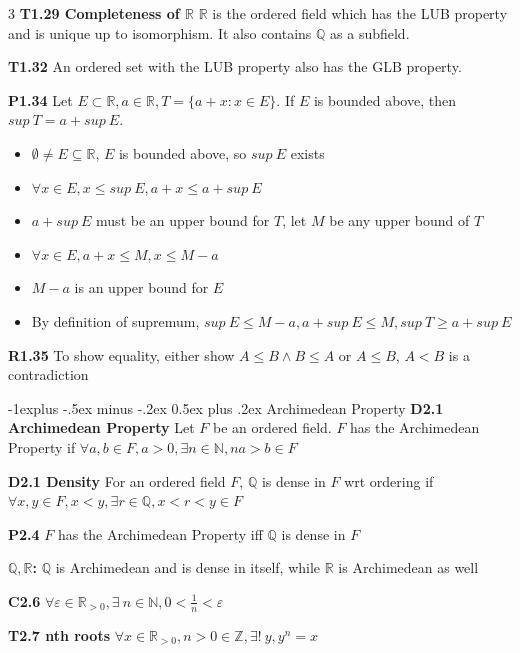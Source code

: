 \documentclass[10pt, landscape]{article}
\makeatletter
\renewcommand{\section}{\@startsection{section}{1}{0mm}%
                                {-1ex plus -.5ex minus -.2ex}%
                                {0.5ex plus .2ex}%
                                {\normalfont\large\bfseries}}
\renewcommand{\section}{\@startsection{section}{2}{0mm}%
                                {-1explus -.5ex minus -.2ex}%
                                {0.5ex plus .2ex}%
                                {\normalfont\normalsize\bfseries}}
\makeatother
\begin{document}
\begin{multicols*}{3}
\textbf{T1.29 Completeness of $\mathbb{R}$} $\mathbb{R}$ is the ordered field which has the LUB property and is unique up to isomorphism. It also contains $\mathbb{Q}$ as a subfield.

\textbf{T1.32} An ordered set with the LUB property also has the GLB property.

\textbf{P1.34} Let $E \subset \mathbb{R}, a \in \mathbb{R}, T=\{a+x:x\in E\}$. If $E$ is bounded above, then $sup\ T=a+sup\ E$.
\begin{itemize}
    \item $\emptyset \neq E \subseteq \mathbb{R}$, $E$ is bounded above, so $sup\ E$ exists
    \item $\forall x \in E, x \leq sup\ E, a+x \leq a + sup\ E$
    \item $a+sup\ E$ must be an upper bound for $T$, let $M$ be any upper bound of $T$
    \item $\forall x \in E, a+x \leq M, x \leq M-a$
    \item $M-a$ is an upper bound for $E$
    \item By definition of supremum, $sup\ E \leq M-a, a+sup\ E \leq M, sup\ T \geq a + sup\ E$
\end{itemize}

\textbf{R1.35} To show equality, either show $A \leq B \land B \leq A$ or $A \leq B$, $A<B$ is a contradiction

\section{Archimedean Property}
\textbf{D2.1 Archimedean Property} Let $F$ be an ordered field. $F$ has the Archimedean Property if $\forall a,b \in F, a > 0, \exists n \in \mathbb{N}, na > b \in F$

\textbf{D2.1 Density} For an ordered field $F$, $\mathbb{Q}$ is dense in $F$ wrt ordering if $\forall x, y \in F, x<y, \exists r \in \mathbb{Q}, x < r < y \in F$

\textbf{P2.4} $F$ has the Archimedean Property iff $\mathbb{Q}$ is dense in $F$

\textbf{$\mathbb{Q}, \mathbb{R}$:} $\mathbb{Q}$ is Archimedean and is dense in itself, while $\mathbb{R}$ is Archimedean as well

\textbf{C2.6} $\forall \varepsilon \in \mathbb{R}_{>0}, \exists\ n \in \mathbb{N}, 0 < \frac{1}{n} < \varepsilon$

\textbf{T2.7 nth roots} $\forall x \in  \mathbb{R}_{>0}, n > 0 \in \mathbb{Z}, \exists!\ y, y^n = x$


\end{multicols*}
\end{document}
